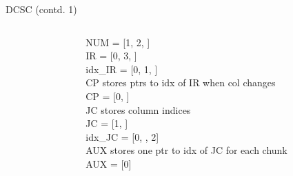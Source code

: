 \documentclass[12pt, usenames, dvipsnames]{beamer}
\begin{document}
\begin{frame}[fragile]{DCSC (contd. 1)}
\begin{columns}
\begin{column}{0.5\textwidth}
\end{column}
\begin{column}{0.5\textwidth}  %
\begin{center}
	NUM = [1, 2, \hspace{0.5cm}  \hspace{0.5cm}] \\
	\vspace{0.3cm}
    IR  = [0, 3, \hspace{0.5cm}\hspace{0.5cm}] \\
    \vspace{0.1cm}
	idx\_IR = [0, 1, \hspace{0.5cm}\hspace{0.5cm}] \\
	\vspace{0.2cm}
    CP stores ptrs to idx of IR when col changes \\
    CP = [0, \hspace{0.5cm}\hspace{0.5cm}] \\
	\vspace{0.3cm}
	JC stores column indices \\
    JC = [1, \hspace{0.5cm}\hspace{0.5cm}] \\
	\vspace{0.3cm}
	idx\_JC = [0, \hspace{0.5cm}\hspace{0.5cm}, 2] \\
	\vspace{0.3cm}
	AUX stores one ptr to idx of JC for each chunk\\
	AUX = [0] \\
\end{center}
	
\end{column}
\end{columns}
\end{frame}
\end{document}

